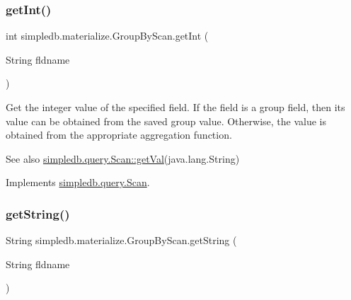 \mbox{\label{classsimpledb_1_1materialize_1_1GroupByScan_a04e34f64ca9d51765f0d6ab05dc157bf}} 
\subsubsection{\texorpdfstring{get\+Int()}{getInt()}}
{\footnotesize\ttfamily int simpledb.\+materialize.\+Group\+By\+Scan.\+get\+Int (\begin{DoxyParamCaption}\item[{String}]{fldname }\end{DoxyParamCaption})\hspace{0.3cm}{\ttfamily [inline]}}

Get the integer value of the specified field. If the field is a group field, then its value can be obtained from the saved group value. Otherwise, the value is obtained from the appropriate aggregation function. \begin{DoxySeeAlso}{See also}
\hyperlink{interfacesimpledb_1_1query_1_1Scan_aca80bca2857c983a88834bf6c01ee5ca}{simpledb.\+query.\+Scan\+::get\+Val}(java.\+lang.\+String) 
\end{DoxySeeAlso}


Implements \hyperlink{interfacesimpledb_1_1query_1_1Scan_a2e064555e16240115167b5d42d2b3d19}{simpledb.\+query.\+Scan}.

\mbox{\label{classsimpledb_1_1materialize_1_1GroupByScan_a5de9ab1d8e9da876aa5cd7cb3b953f62}} 
\subsubsection{\texorpdfstring{get\+String()}{getString()}}
{\footnotesize\ttfamily String simpledb.\+materialize.\+Group\+By\+Scan.\+get\+String (\begin{DoxyParamCaption}\item[{String}]{fldname }\end{DoxyParamCaption})\hspace{0.3cm}{\ttfamily [inline]}}

